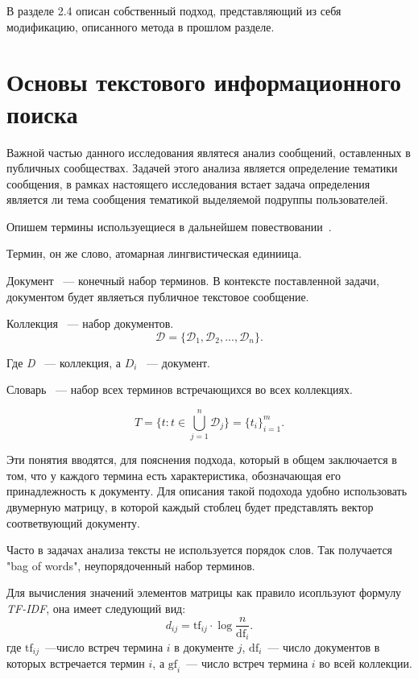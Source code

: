 \documentclass[annotation,times,page4]{itmo-student-thesis}
\begin{document}
В разделе 2.4 описан собственный подход, представляющий из себя модификацию, описанного метода в прошлом разделе. 
\section{Основы текстового информационного поиска}
Важной частью данного исследования являтеся анализ сообщений, оставленных в публичных сообществах. Задачей этого анализа является определение тематики сообщения, в рамках настоящего исследования встает задача определения является ли тема сообщения тематикой выделяемой подруппы пользователей.

Опишем термины используещиеся в дальнейшем повествовании~\cite{manning2008introduction}.  

Термин, он же слово, атомарная лингвистическая единиица.

Документ ~--- конечный набор терминов. В контексте поставленной задачи, документом будет являеться публичное текстовое сообщение.

Коллекция ~--- набор документов.
\[
    \mathcal{D} = \{\mathcal{D}_1, \mathcal{D}_2,...,\mathcal{D}_n\}.
\]
 
Где \textit{D} ~--- коллекция, а $D_{i}$ ~--- документ.

Словарь ~--- набор всех терминов встречающихся во всех коллекциях.

\[
    T = \{t \colon t \in \bigcup_{j=1}^{n} \mathcal{D}_j\} = \{t_i\}_{i=1}^{m}.
\]

Эти понятия вводятся, для пояснения подхода, который в общем заключается в том, что у каждого термина есть характеристика, обозначающая его принадлежность к документу. Для описания такой подохода удобно использовать двумерную матрицу, в которой каждый стоблец будет представлять вектор соответвующий документу.

Часто в задачах анализа тексты не используется порядок слов. Так получается "bag of words", неупорядоченный набор терминов.

Для вычисления значений элементов матрицы как правило исопльзуют формулу \textit{ TF-IDF}, она имеет следующий вид: 
\begin{equation}\label{eq:tf_idf}
    d_{ij} = \mathrm{tf}_{ij} \cdot \log{\frac{n}{\mathrm{df}_{i}}}.
\end{equation} 
где $\mathrm{tf}_{ij}$~---число встреч термина $i$ в документе $j$, $\mathrm{df}_{i}$~---
число документов в которых встречается термин $i$, а $\mathrm{gf}_{i}$~---
число встреч термина $i$ во всей коллекции.
\end{document}
